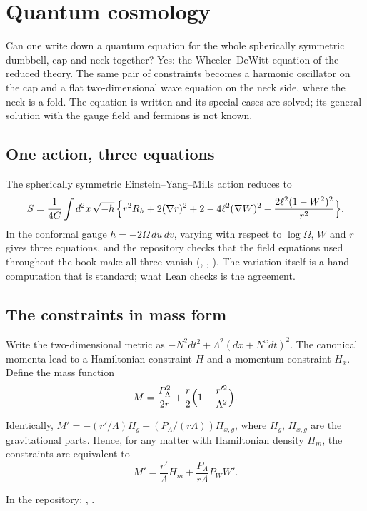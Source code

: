 \chapter{Quantum cosmology}\label{ch:wdw}

\begin{questionbox}
Can one write down a quantum equation for the whole spherically symmetric dumbbell, cap and neck together? Yes: the Wheeler--DeWitt equation of the reduced theory. The same pair of constraints becomes a harmonic oscillator on the cap and a flat two-dimensional wave equation on the neck side, where the neck is a fold. The equation is written and its special cases are solved; its general solution with the gauge field and fermions is not known.
\end{questionbox}

\section{One action, three equations}

The spherically symmetric Einstein--Yang--Mills action reduces to
\[
S=\frac1{4G}\int d^2x\,\sqrt{-h}\,\Bigl\{r^2R_h+2(\nabla r)^2+2-4\ell^2(\nabla W)^2-\frac{2\ell^2(1-W^2)^2}{r^2}\Bigr\}.
\]
In the conformal gauge $h=-2\Omega\,du\,dv$, varying with respect to $\log\Omega$, $W$ and $r$ gives three equations, and the repository checks that the field equations used throughout the book make all three vanish (, , ). The variation itself is a hand computation that is standard; what Lean checks is the agreement.

\section{The constraints in mass form}

Write the two-dimensional metric as $-N^2dt^2+\Lambda^2(dx+N^xdt)^2$. The canonical momenta lead to a Hamiltonian constraint $H$ and a momentum constraint $H_x$. Define the mass function
\[
M=\frac{P_\Lambda^2}{2r}+\frac r2\Bigl(1-\frac{r'^2}{\Lambda^2}\Bigr).
\]

\begin{theorem}\proved
Identically, $M'=-(r'/\Lambda)H_g-(P_\Lambda/(r\Lambda))H_{x,g}$, where $H_g$, $H_{x,g}$ are the gravitational parts. Hence, for any matter with Hamiltonian density $H_m$, the constraints are equivalent to
\[
M'=\frac{r'}\Lambda H_m+\frac{P_\Lambda}{r\Lambda}P_WW' .
\]
\end{theorem}
\noindent In the repository: , .

